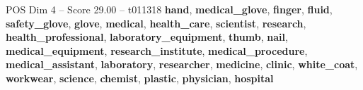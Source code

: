 \begin{textsample}{POS Dim 4 – Score 29.00 – t011318}  \label{ex:f4_pos_025}
\textbf{hand}, \textbf{medical\_glove}, \textbf{finger}, \textbf{fluid}, \textbf{safety\_glove}, \textbf{glove}, \textbf{medical}, \textbf{health\_care}, \textbf{scientist}, \textbf{research}, \textbf{health\_professional}, \textbf{laboratory\_equipment}, \textbf{thumb}, \textbf{nail}, \textbf{medical\_equipment}, \textbf{research\_institute}, \textbf{medical\_procedure}, \textbf{medical\_assistant}, \textbf{laboratory}, \textbf{researcher}, \textbf{medicine}, \textbf{clinic}, \textbf{white\_coat}, \textbf{workwear}, \textbf{science}, \textbf{chemist}, \textbf{plastic}, \textbf{physician}, \textbf{hospital}

\end{textsample}
